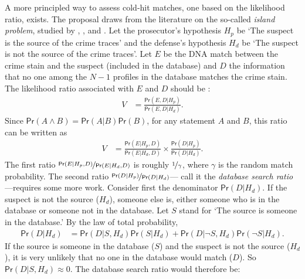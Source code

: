 \documentclass{article}
\newcommand{\pr}{\mathsf{Pr}}
\begin{document}
A more principled way to assess cold-hit matches, one based on the likelihood ratio, exists.  The proposal  draws from the literature on  the so-called \emph{island problem}, studied by \citet{eggleston1978evidence},  \citet{dawid1994island}, and \citet{dawid1996CoherentAnalysisForensic}.
Let the prosecutor's hypothesis $H_p$ be `The suspect is the source of the crime traces' and the defense's hypothesis $H_d$ be `The suspect is not the source of the crime traces'.  Let $E$ be the DNA  match between the crime stain and the suspect (included in the database) and $D$ the information that no one among the $N-1$ profiles in the database matches the crime stain.  The likelihood ratio associated with $E$ and $D$ should be \citep{balding1996EvaluatingDNAProfilea, taroni2006bayesian}:
%
\begin{align*}
V & = \frac{\pr(E,D\vert H_p)}{\pr(E,D\vert H_d)}.
\end{align*}
%
Since $\pr(A\wedge B)=\pr(A\vert B)\pr(B)$, for any statement $A$ and $B$, this ratio can be written as
%
\begin{align*}
V & = \frac{\pr(E\vert H_p,D)}{\pr(E\vert H_d,D)} \times \frac{\pr(D\vert H_p)}{\pr(D\vert H_d)}.
\end{align*}
%
The first ratio $\nicefrac{\pr(E\vert H_p,D)}{\pr(E\vert H_d,D)}$ is roughly $\nicefrac{1}{\gamma}$, where $\gamma$ is the random match probability. The second ratio $\nicefrac{\pr(D\vert H_p)}{\pr(D\vert H_d)}$--- call it the \emph{database search ratio}---requires some more work. Consider first the denominator $\pr(D \vert H_d)$. If the suspect is not the source ($H_d$),  someone else is, either someone who is in the database or someone not in the database. Let $S$ stand for `The  source is someone in the database.' By the law of total probability, 
%
\begin{align*}
\pr(D\vert H_d) & = \pr(D\vert S, H_d) \pr(S\vert H_d) + \pr(D\vert \neg S, H_d) \pr(\neg S \vert H_d). 
\end{align*}
%
If the source is someone in the database ($S$) and the suspect is not the source ($H_d$), it is very unlikely that no one in the database would match ($D$). 
So $\pr(D\vert S, H_d)\approx 0$. 
%
The database search ratio 
would therefore
be:
%
\end{document}
